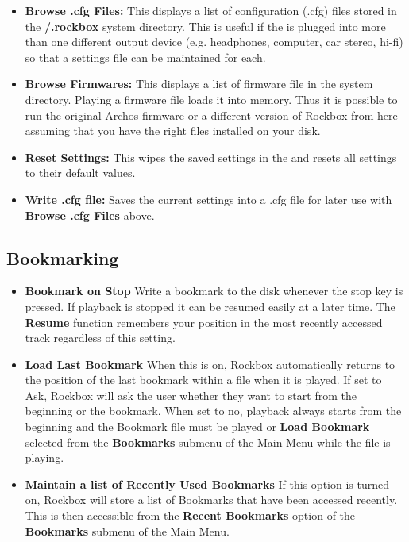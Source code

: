 \begin{itemize}
\begin{itemize}
    \begin{itemize}
    \item \textbf{Browse .cfg Files: }
      This displays a list of configuration (.cfg) files stored in the \textbf{/.rockbox} system directory.  This is useful if the \dap is plugged into more than one different output device (e.g. headphones, computer, car stereo, hi{}-fi) so that a settings file can be maintained for each.
    \item \textbf{Browse Firmwares:} 
      This displays a list of firmware file in the  system directory. Playing a firmware file loads it into memory.  Thus it is possible to run the original Archos firmware or a different version of Rockbox from here assuming that you have the right files installed on your disk.
    \item \textbf{Reset Settings: }
      This wipes the saved settings in the \dap and resets all settings to their default values.
    \item \textbf{Write .cfg file: }
      Saves the current settings into a .cfg file for later use with \textbf{Browse .cfg Files} above.
    \end{itemize}
    
  \end{itemize}
  
  \subsection{\label{ref:Bookmarkconfigactual}Bookmarking}
  
  \begin{itemize}
  \item \textbf{Bookmark on Stop}
    Write a bookmark to the disk whenever the stop key is pressed.  If playback is stopped it can be resumed easily at a later time. The \textbf{Resume} function remembers your position in the most recently accessed track regardless of this setting.
  \item \textbf{Load Last Bookmark}
    When this is on, Rockbox automatically returns to the position of the last bookmark within a file when it is played.  If set to Ask, Rockbox will ask the user whether they want to start from the beginning or the bookmark.  When set to no, playback always starts from the beginning and the Bookmark file must be played or \textbf{Load Bookmark} selected from the \textbf{Bookmarks} submenu of the Main Menu while the file is playing.
  \item \textbf{Maintain a list of Recently Used Bookmarks}
    If this option is turned on, Rockbox will store a list of Bookmarks that have been accessed recently.  This is then accessible from the \textbf{Recent Bookmarks} option of the \textbf{Bookmarks} submenu of the Main Menu.
  \end{itemize}
  

\end{itemize}
